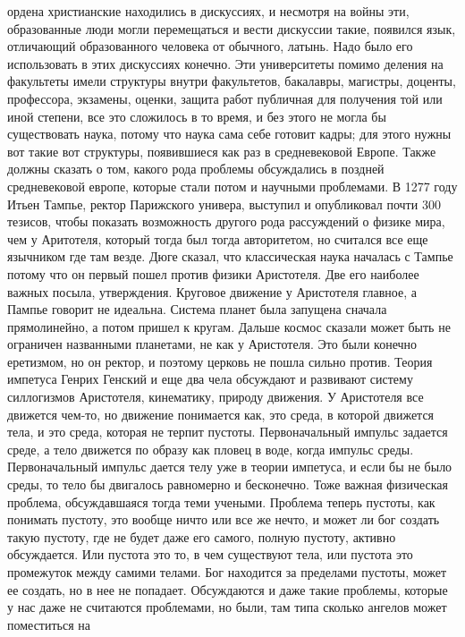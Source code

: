 \documentclass[a4paper, 12pt]{article}
\begin{document}
ордена христианские находились в дискуссиях, и несмотря на войны эти, 
образованные люди могли перемещаться и вести дискуссии такие, появился 
язык, отличающий образованного человека от обычного, латынь. Надо было 
его использовать в этих дискуссиях конечно. Эти университеты помимо 
деления на факультеты имели структуры внутри факультетов, бакалавры, 
магистры, доценты, профессора, экзамены, оценки, защита работ публичная 
для получения той или иной степени, все это сложилось в то время, и без 
этого не могла бы существовать наука, потому что наука сама себе готовит 
кадры; для этого нужны вот такие вот структуры, появившиеся как раз 
в средневековой Европе. Также должны сказать о том, какого рода проблемы 
обсуждались в поздней средневековой европе, которые стали потом 
и научными проблемами. В 1277 году Итьен Тампье, ректор Парижского 
универа, выступил и опубликовал почти 300 тезисов, чтобы показать 
возможность другого рода рассуждений о физике мира, чем у Аритотеля, 
который тогда был тогда авторитетом, но считался все еще язычником где 
там везде. Дюге сказал, что классическая наука началась с Тампье потому 
что он первый пошел против физики Аристотеля. Две его наиболее важных 
посыла, утверждения. Круговое движение у Аристотеля главное, а Пампье 
говорит не идеальна. Система планет была запущена сначала прямолинейно, 
а потом пришел к кругам. Дальше космос сказали может быть не ограничен 
названными планетами, не как у Аристотеля. Это были конечно еретизмом, 
но он ректор, и поэтому церковь не пошла сильно против. Теория импетуса 
Генрих Генский и еще два чела обсуждают и развивают систему силлогизмов 
Аристотеля, кинематику, природу движения. У Аристотеля все движется 
чем-то, но движение понимается как, это среда, в которой движется тела, 
и это среда, которая не терпит пустоты. Первоначальный импульс задается 
среде, а тело движется по образу как пловец в воде, когда импульс среды. 
Первоначальный импульс дается телу уже в теории импетуса, и если бы не 
было среды, то тело бы двигалось равномерно и бесконечно. Тоже важная 
физическая проблема, обсуждавшаяся тогда теми учеными. Проблема теперь 
пустоты, как понимать пустоту, это вообще ничто или все же нечто, 
и может ли бог создать такую пустоту, где не будет даже его самого, 
полную пустоту, активно обсуждается. Или пустота это то, в чем 
существуют тела, или пустота это промежуток между самими телами. Бог 
находится за пределами пустоты, может ее создать, но в нее не попадает. 
Обсуждаются и даже такие проблемы, которые у нас даже не считаются 
проблемами, но были, там типа сколько ангелов может поместиться на 
\end{document}
